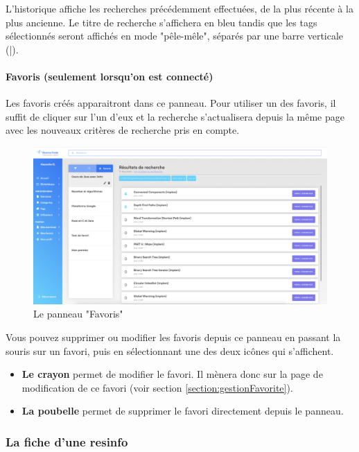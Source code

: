 L'historique affiche les recherches précédemment effectuées, de la plus récente à la plus ancienne. Le titre de recherche s'affichera en bleu tandis que les \glspl{tag} sélectionnés seront affichés en mode "pêle-mêle", séparés par une barre verticale (|).\\

\paragraph{Favoris (seulement lorsqu'on est connecté)} Les favoris créés apparaitront dans ce panneau. Pour utiliser un des favoris, il suffit de cliquer sur l'un d'eux et la recherche s'actualisera depuis la même page avec les nouveaux critères de recherche pris en compte.

\begin{figure}[H]
    \includegraphics[width=\textwidth,height=\textheight,keepaspectratio]{images/client/favorite-panel.png}
    \centering
    \caption[SourceCode : le panneau "Favoris"]{Le panneau "Favoris"}
\end{figure}

Vous pouvez supprimer ou modifier les favoris depuis ce panneau en passant la souris sur un favori, puis en sélectionnant une des deux icônes qui s'affichent.

\begin{itemize}
    \item \textbf{Le crayon} permet de modifier le favori. Il mènera donc sur la page de modification de ce favori (voir section \ref{section:gestionFavorite}).
    \item \textbf{La poubelle} permet de supprimer le favori directement depuis le panneau.
\end{itemize}


\subsubsection{La \gls{fiche} d’une \gls{resinfo}}
\label{section:ficheResInfo}

